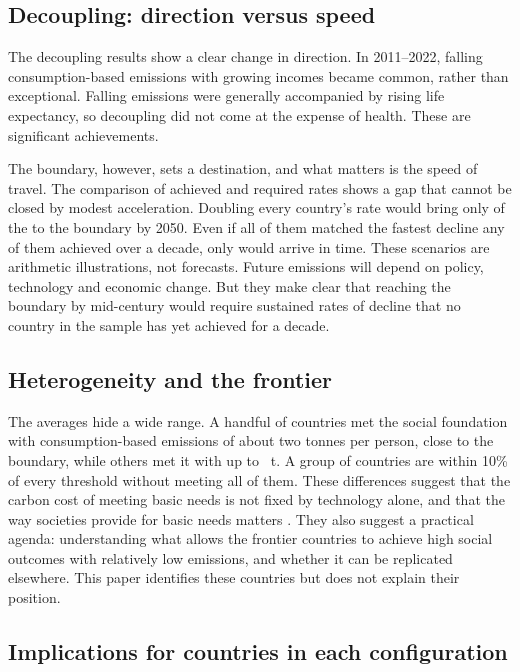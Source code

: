 \subsection{Decoupling: direction versus speed}

The decoupling results show a clear change in direction. In 2011--2022, falling consumption-based emissions with growing incomes became common, rather than exceptional. Falling emissions were generally accompanied by rising life expectancy, so decoupling did not come at the expense of health. These are significant achievements.

The boundary, however, sets a destination, and what matters is the speed of travel. The comparison of achieved and required rates shows a gap that cannot be closed by modest acceleration. Doubling every country's rate would bring only \nScenDouble{} of the \nDecAbsAbove{} to the boundary by 2050. Even if all of them matched the fastest decline any of them achieved over a decade, only \nScenFastest{} would arrive in time. These scenarios are arithmetic illustrations, not forecasts. Future emissions will depend on policy, technology and economic change. But they make clear that reaching the boundary by mid-century would require sustained rates of decline that no country in the sample has yet achieved for a decade.

\subsection{Heterogeneity and the frontier}

The averages hide a wide range. A handful of countries met the social foundation with consumption-based emissions of about two tonnes per person, close to the boundary, while others met it with up to \nMetMaxCons~t. A group of \nNearN{} countries are within 10\% of every threshold without meeting all of them. These differences suggest that the carbon cost of meeting basic needs is not fixed by technology alone, and that the way societies provide for basic needs matters \citep{vogel2021}. They also suggest a practical agenda: understanding what allows the frontier countries to achieve high social outcomes with relatively low emissions, and whether it can be replicated elsewhere. This paper identifies these countries but does not explain their position.

\subsection{Implications for countries in each configuration}

